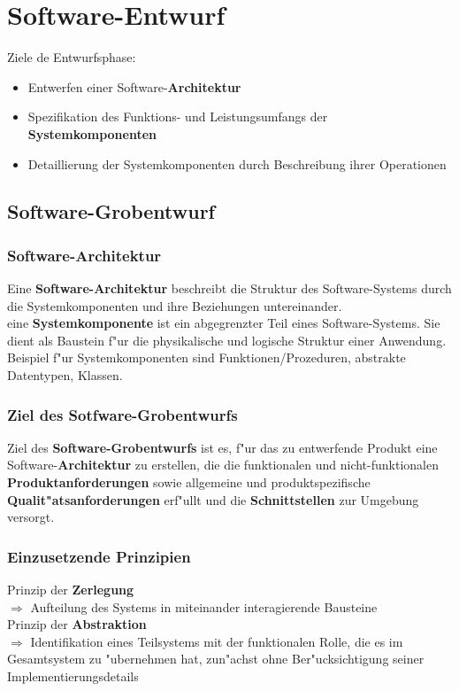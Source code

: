 
\section{Software-Entwurf}

Ziele de Entwurfsphase:
\begin{itemize}
    \item Entwerfen einer Software-\textbf{Architektur}
    \item Spezifikation des Funktions- und Leistungsumfangs der \textbf{Systemkomponenten}
    \item Detaillierung der Systemkomponenten durch Beschreibung ihrer Operationen
\end{itemize}

\subsection{Software-Grobentwurf}

\subsubsection{Software-Architektur}
Eine \textbf{Software-Architektur} beschreibt die Struktur des Software-Systems durch die Systemkomponenten und ihre Beziehungen untereinander.\\
eine \textbf{Systemkomponente} ist ein abgegrenzter Teil eines Software-Systems.
Sie dient als Baustein f"ur die physikalische und logische Struktur einer Anwendung.
Beispiel f"ur Systemkomponenten sind Funktionen/Prozeduren, abstrakte Datentypen, Klassen.

\subsubsection{Ziel des Sotfware-Grobentwurfs}
Ziel des \textbf{Software-Grobentwurfs} ist es, f"ur das zu entwerfende Produkt eine Software-\textbf{Architektur} zu erstellen, die die funktionalen und nicht-funktionalen \textbf{Produktanforderungen} sowie allgemeine und produktspezifische \textbf{Qualit"atsanforderungen} erf"ullt und die \textbf{Schnittstellen} zur Umgebung versorgt.

\subsubsection{Einzusetzende Prinzipien}
Prinzip der \textbf{Zerlegung}\\
$\Rightarrow$ Aufteilung des Systems in miteinander interagierende Bausteine\\
Prinzip der \textbf{Abstraktion}\\
$\Rightarrow$ Identifikation eines Teilsystems mit der funktionalen Rolle, die es im Gesamtsystem zu "ubernehmen hat, zun"achst ohne Ber"ucksichtigung seiner Implementierungsdetails

